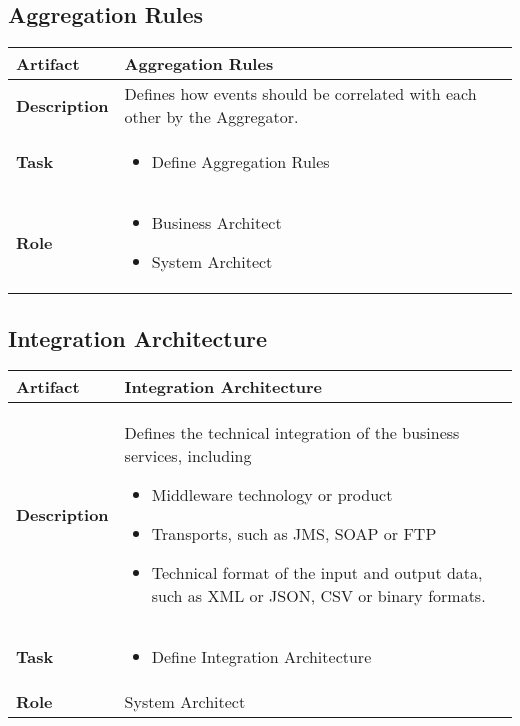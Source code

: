 \subsection{Aggregation Rules}
\begin{minipage}{\textwidth}
 \label{table:ch6_Artifact_Aggregation_Rules}
\begin{tabular}
	{|m{2cm}|m{10cm}|} \hline \bfseries Artifact & Aggregation Rules\\
	\hline \bfseries Description & Defines how events should be correlated with each other by the Aggregator.\\
	\hline \bfseries Task & 
	\begin{itemize}
		\item Define Aggregation Rules
	\end{itemize}
	\\
	\hline \bfseries Role & 
	\begin{itemize}
		\item Business Architect
		\item System Architect
	\end{itemize}
	\\
	\hline 
\end{tabular}
\end{minipage}

\subsection{Integration Architecture}
\begin{minipage}{\textwidth}
 \label{table:ch6_Artifact_Integration_Architecture}
\begin{tabular}
	{|m{2cm}|m{10cm}|} \hline \bfseries Artifact & Integration Architecture\\
	\hline \bfseries Description & Defines the technical integration of the business services, including
	\begin{itemize}
		\item Middleware technology or product
		\item Transports, such as \ac{JMS}, \ac{SOAP} or \ac{FTP}
		\item Technical format of the input and output data, such as \ac{XML} or \ac{JSON}, \ac{CSV} or binary formats.
	\end{itemize}
	\\
	\hline \bfseries Task & 
	\begin{itemize}
		\item Define Integration Architecture 
	\end{itemize}
	\\
	\hline \bfseries Role & System Architect\\
	\hline 
\end{tabular}
\end{minipage}

